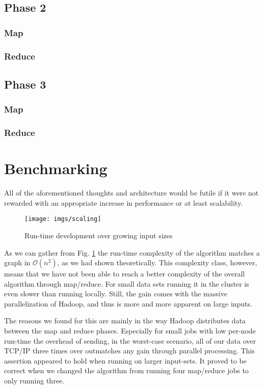 \documentclass{llncs}
\begin{document}
\subsection{Phase 2}
\subsubsection{Map}
\subsubsection{Reduce}
\subsection{Phase 3}
\subsubsection{Map}
\subsubsection{Reduce} %
\section{Benchmarking}
All of the aforementioned thoughts and architecture would be futile if it were not 
rewarded with an appropriate increase in performance or at least scalability. 
\begin{figure}[tb]
  \begin{center}
    \texttt{[image: imgs/scaling]}
  \end{center}
  \caption{Run-time development over growing input sizes}
  \label{fig:runtime}
\end{figure}
As we can gather from Fig. \ref{fig:runtime} the run-time complexity of the 
algorithm matches a graph in $\mathcal{O}(n^2)$, as we had shown theoretically.
This complexity class, however, means that we have not been able to reach a 
better complexity of the overall algorithm through map/reduce. For small data sets
running it in the cluster is even slower than running locally. Still, the 
gain comes with the massive parallelization of Hadoop, and thus is more and more 
apparent on large inputs.

The reasons we found for this are mainly in the way Hadoop distributes data 
between the map and reduce phases. Especially for small jobs with low per-node 
run-time the overhead of sending, in the worst-case scenario, all of our data 
over TCP/IP three times over outmatches any gain through 
parallel processing. This assertion appeared to hold when running on larger 
input-sets. It proved to be correct when we changed the algorithm from running 
four map/reduce jobs to only running three.
\end{document}
